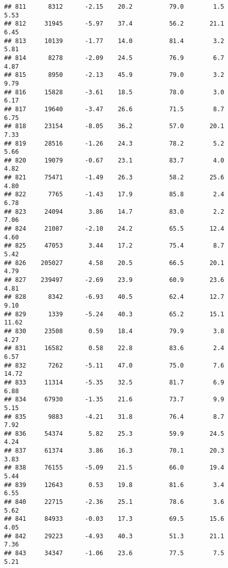 \documentclass[
]{article}
\begin{document}
\begin{verbatim}
## 811      8312      -2.15    20.2          79.0        1.5              5.53
## 812     31945      -5.97    37.4          56.2       21.1              6.45
## 813     10139      -1.77    14.0          81.4        3.2              5.81
## 814      8278      -2.09    24.5          76.9        6.7              4.87
## 815      8950      -2.13    45.9          79.0        3.2              9.79
## 816     15828      -3.61    18.5          78.0        3.0              6.17
## 817     19640      -3.47    26.6          71.5        8.7              6.75
## 818     23154      -8.05    36.2          57.0       20.1              7.33
## 819     28516      -1.26    24.3          78.2        5.2              5.66
## 820     19079      -0.67    23.1          83.7        4.0              4.82
## 821     75471      -1.49    26.3          58.2       25.6              4.80
## 822      7765      -1.43    17.9          85.8        2.4              6.78
## 823     24094       3.86    14.7          83.0        2.2              7.06
## 824     21087      -2.10    24.2          65.5       12.4              4.60
## 825     47053       3.44    17.2          75.4        8.7              5.42
## 826    205027       4.58    20.5          66.5       20.1              4.79
## 827    239497      -2.69    23.9          60.9       23.6              4.81
## 828      8342      -6.93    40.5          62.4       12.7              9.10
## 829      1339      -5.24    40.3          65.2       15.1             11.62
## 830     23508       0.59    18.4          79.9        3.8              4.27
## 831     16582       0.58    22.8          83.6        2.4              6.57
## 832      7262      -5.11    47.0          75.0        7.6             14.72
## 833     11314      -5.35    32.5          81.7        6.9              6.88
## 834     67930      -1.35    21.6          73.7        9.9              5.15
## 835      9883      -4.21    31.8          76.4        8.7              7.92
## 836     54374       5.82    25.3          59.9       24.5              4.24
## 837     61374       3.86    16.3          70.1       20.3              3.83
## 838     76155      -5.09    21.5          66.0       19.4              5.44
## 839     12643       0.53    19.8          81.6        3.4              6.55
## 840     22715      -2.36    25.1          78.6        3.6              5.62
## 841     84933      -0.03    17.3          69.5       15.6              4.05
## 842     29223      -4.93    40.3          51.3       21.1              7.36
## 843     34347      -1.06    23.6          77.5        7.5              5.21

\end{verbatim}
\end{document}
